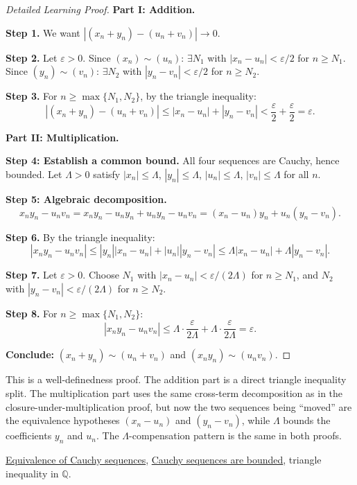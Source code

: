 \begin{proof}[Detailed Learning Proof]
\LRAProofBodyStart
\textbf{Part I: Addition.}

\textbf{Step 1.}  We want $|(x_n+y_n)-(u_n+v_n)| \to 0$.

\textbf{Step 2.}  Let $\varepsilon > 0$.  Since $(x_n) \sim (u_n)$:
$\exists N_1$ with $|x_n - u_n| < \varepsilon/2$ for $n \geq N_1$.
Since $(y_n) \sim (v_n)$: $\exists N_2$ with $|y_n - v_n| < \varepsilon/2$
for $n \geq N_2$.

\textbf{Step 3.}  For $n \geq \max\{N_1, N_2\}$, by the triangle inequality:
\[
|(x_n+y_n)-(u_n+v_n)|
\leq |x_n-u_n| + |y_n-v_n|
< \frac{\varepsilon}{2}+\frac{\varepsilon}{2} = \varepsilon.
\]

\textbf{Part II: Multiplication.}

\textbf{Step 4: Establish a common bound.}
All four sequences are Cauchy, hence bounded.
Let $\Lambda > 0$ satisfy $|x_n| \leq \Lambda$, $|y_n| \leq \Lambda$,
$|u_n| \leq \Lambda$, $|v_n| \leq \Lambda$ for all $n$.

\textbf{Step 5: Algebraic decomposition.}
\[
x_n y_n - u_n v_n
= x_n y_n - u_n y_n + u_n y_n - u_n v_n
= (x_n - u_n)y_n + u_n(y_n - v_n).
\]

\textbf{Step 6.}  By the triangle inequality:
\[
|x_n y_n - u_n v_n|
\leq |y_n||x_n - u_n| + |u_n||y_n - v_n|
\leq \Lambda|x_n - u_n| + \Lambda|y_n - v_n|.
\]

\textbf{Step 7.}  Let $\varepsilon > 0$.  Choose $N_1$ with
$|x_n - u_n| < \varepsilon/(2\Lambda)$ for $n \geq N_1$, and $N_2$ with
$|y_n - v_n| < \varepsilon/(2\Lambda)$ for $n \geq N_2$.

\textbf{Step 8.}  For $n \geq \max\{N_1, N_2\}$:
\[
|x_n y_n - u_n v_n|
\leq \Lambda \cdot \frac{\varepsilon}{2\Lambda} + \Lambda \cdot \frac{\varepsilon}{2\Lambda}
= \varepsilon.
\]

\textbf{Conclude:} $(x_n+y_n) \sim (u_n+v_n)$ and $(x_n y_n) \sim (u_n v_n)$.
\end{proof}

\begin{remark*}
This is a well-definedness proof.  The addition part is a direct triangle
inequality split.  The multiplication part uses the same cross-term
decomposition as in the closure-under-multiplication proof, but now the
two sequences being ``moved'' are the equivalence hypotheses $(x_n - u_n)$
and $(y_n - v_n)$, while $\Lambda$ bounds the coefficients $y_n$ and $u_n$.
The $\Lambda$-compensation pattern is the same in both proofs.
\end{remark*}

\begin{dependencies}
\hyperref[def:cauchy-equivalence]{Equivalence of Cauchy sequences},
\hyperref[thm:cauchy-bounded-q]{Cauchy sequences are bounded},
triangle inequality in $\mathbb{Q}$.
\end{dependencies}

\clearpage
